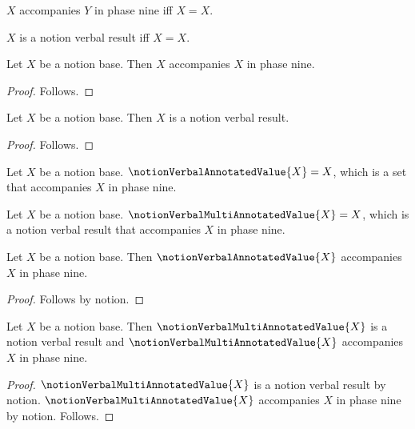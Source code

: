 

\begin{definition}\label{notion_result_accompanies}
    $X$ accompanies $Y$ in phase nine iff $X=X$.
\end{definition}

\begin{definition}\label{notion_verbal_result}
    $X$ is a notion verbal result iff $X=X$.
\end{definition}

\begin{classification}\label{notion_base_has_verbal_result}
    Let $X$ be a notion base.
    Then $X$ accompanies $X$ in phase nine.
\end{classification}
\begin{proof}
    Follows.
\end{proof}

\begin{classification}\label{notion_base_is_verbal_result}
    Let $X$ be a notion base.
    Then $X$ is a notion verbal result.
\end{classification}
\begin{proof}
    Follows.
\end{proof}

\begin{definition}\label{notion_verbal_annotated_value}
    Let $X$ be a notion base.
    $\notionVerbalAnnotatedValue{X}=X$, which is a set
        that accompanies $X$ in phase nine.
\end{definition}

\begin{definition}\label{notion_verbal_multi_annotated_value}
    Let $X$ be a notion base.
    $\notionVerbalMultiAnnotatedValue{X}=X$, which is a
        notion verbal result that accompanies $X$ in phase nine.
\end{definition}

\begin{proposition}\label{notion_verbal_result_use}
    Let $X$ be a notion base.
    Then $\notionVerbalAnnotatedValue{X}$ accompanies $X$ in phase nine.
\end{proposition}
\begin{proof}
    Follows by notion.
\end{proof}

\begin{proposition}\label{notion_verbal_multi_result_use}
    Let $X$ be a notion base.
    Then $\notionVerbalMultiAnnotatedValue{X}$ is a notion verbal result and
        $\notionVerbalMultiAnnotatedValue{X}$ accompanies $X$ in phase nine.
\end{proposition}
\begin{proof}
    $\notionVerbalMultiAnnotatedValue{X}$ is a notion verbal result by notion.
    $\notionVerbalMultiAnnotatedValue{X}$ accompanies $X$ in phase nine by notion.
    Follows.
\end{proof}
